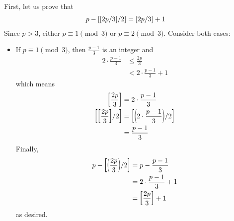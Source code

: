 \documentclass{subfile}
\begin{document}
	\begin{solution}
		First, let us prove that
			\begin{align}\label{eq:primefloor}
				p - \floor{\floor{2p/3}/2}
					& = \floor{2p/3}+ 1
			\end{align}
		Since $p>3$, either $p \equiv 1 \pmod 3$ or $p \equiv 2 \pmod 3$. Consider both cases:
		\begin{itemize}
			\item If $p \equiv 1 \pmod 3$, then $\frac{p-1}{3}$ is an integer and
				\begin{align*}
					2\cdot\frac {p - 1}{3}
						& \leq\frac {2p}{3}\\
						& < 2\cdot\frac {p - 1}{3} + 1
				\end{align*}
			which means
				\begin{align*}
					\floor{\frac {2p}{3}}
						&= 2\cdot\frac {p - 1}{3}\\
					\floor{\floor{\frac {2p}{3}}/2}
						&= \floor{\func{}{2\cdot\frac {p - 1}{3}}/2}\\
						& = \frac {p - 1}{3}
				\end{align*}
			Finally,
				\begin{align*}
					p - \floor{\func{}{\frac {2p}{3}}/2}
						& = p - \frac {p - 1}{3}\\
						& = 2\cdot\frac {p - 1}{3} + 1\\
						& = \floor{\frac {2p}{3}}+ 1
				\end{align*}
			as desired.


\end{itemize}
\end{solution}
\end{document}
